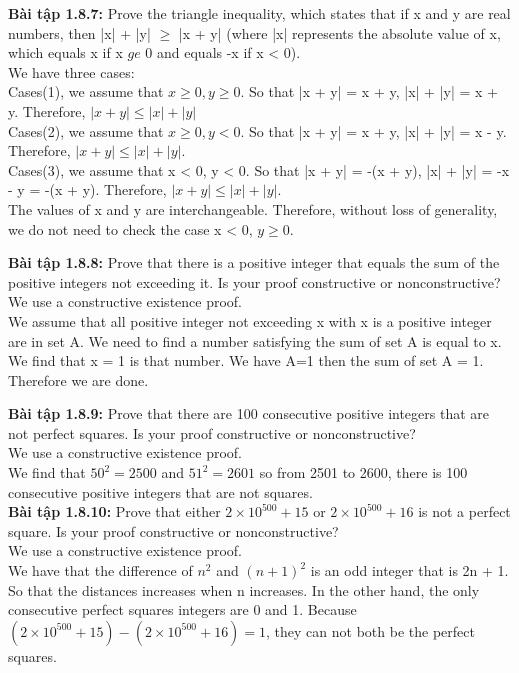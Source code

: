 \documentclass[a4paper]{article}
\begin{document}
\begin{enumerate}
\textbf{ Bài tập 1.8.7:} 
Prove the triangle inequality, which states that if x and y are real numbers, then |x| + |y| $\ge$ |x + y| (where |x| represents the absolute value of x, which equals x if x $ge$ 0 and equals -x if x < 0).\\
We have three cases:\\
Cases(1), we assume that $x \ge 0, y \ge 0$. So that |x + y| = x + y, |x| + |y| = x + y. Therefore, $|x + y| \le |x| + |y|$\\
Cases(2), we assume that $x \ge 0, y < 0$. So that |x + y| = x + y, |x| + |y| = x - y. Therefore, $|x + y| \le |x| + |y|$.\\
Cases(3), we assume that x < 0, y < 0. So that |x + y| = -(x + y), |x| + |y| = -x - y = -(x + y). Therefore, $|x + y| \le |x| + |y|$.\\
The values of x and y are interchangeable. Therefore, without loss of generality, we do not need to check the case x < 0, $y \ge 0$. 

\textbf{Bài tập 1.8.8:} Prove that there is a positive integer that equals the sum of the positive integers not exceeding it. Is your proof constructive or nonconstructive?\\
We use a constructive existence proof.\\
We assume that all positive integer not exceeding x with x is a positive integer are in set A. We need to find a number satisfying the sum of  set A is equal to x. We find that x = 1 is that number. We have A={1} then the sum of set A = 1. Therefore we are done.

\textbf{Bài tập 1.8.9:} Prove that there are 100 consecutive positive integers that are not perfect squares. Is your proof constructive or nonconstructive?\\
We use a constructive existence proof.\\
We find that $50^{2} = 2500$ and $51^{2} = 2601$ so from 2501 to 2600, there is 100 consecutive positive integers that are not squares.\\

\textbf{Bài tập 1.8.10:} Prove that either $2 \times 10^{500} + 15$ or $2 \times 10^{500} + 16$ is not a perfect square. Is your proof constructive or nonconstructive?\\
We use a constructive existence proof.\\ 
We have that the difference of $n^{2}$ and $(n+1)^{2}$ is an odd integer that is 2n + 1. So that the distances increases when n increases. In the other hand, the only consecutive perfect squares integers are 0 and 1. Because  $(2 \times 10^{500} + 15) - (2 \times 10^{500} + 16) = 1$, they can not both be the perfect squares.\\


\end{enumerate}
\end{document}
